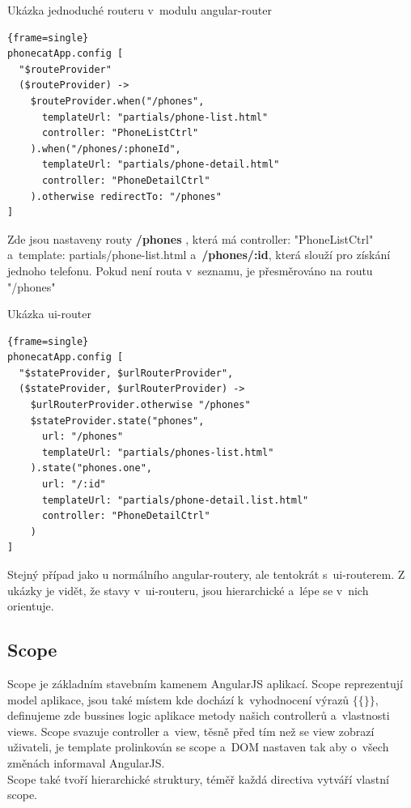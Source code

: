 \documentclass[a4paper,12pt,twoside,BCOR=10mm]{article}
\renewcommand{\b}[1]{\textbf{#1}} %
\newenvironment{codeframe}{%
  \begin{Sbox} 
    \begin{minipage} 
      {\columnwidth-\leftmargin-\rightmargin-2\fboxsep-2\fboxrule-4pt} 
}{%

  \end{minipage} 
  \end{Sbox} 
  \begin{center} 
    \fcolorbox{black}{codeback}{\TheSbox} 
  \end{center} 
}
\begin{document}
Ukázka jednoduché routeru v~modulu angular-router
     \begin{codeframe} 
      \begin{Verbatim}{frame=single}
phonecatApp.config [
  "$routeProvider"
  ($routeProvider) ->
    $routeProvider.when("/phones",
      templateUrl: "partials/phone-list.html"
      controller: "PhoneListCtrl"
    ).when("/phones/:phoneId",
      templateUrl: "partials/phone-detail.html"
      controller: "PhoneDetailCtrl"
    ).otherwise redirectTo: "/phones"
]
\end{Verbatim} 
    \end{codeframe}
Zde jsou nastaveny routy \b{/phones} , která má controller: "PhoneListCtrl" a~template: partials/phone-list.html a~\b{/phones/:id}, která slouží pro získání jednoho telefonu. Pokud není routa v~seznamu, je přesměrováno na routu "/phones"

Ukázka ui-router
     \begin{codeframe} 
      \begin{Verbatim}{frame=single}
phonecatApp.config [
  "$stateProvider, $urlRouterProvider",
  ($stateProvider, $urlRouterProvider) ->
    $urlRouterProvider.otherwise "/phones"
    $stateProvider.state("phones",
      url: "/phones"
      templateUrl: "partials/phones-list.html"
    ).state("phones.one",
      url: "/:id"
      templateUrl: "partials/phone-detail.list.html"
      controller: "PhoneDetailCtrl"
    )
]
\end{Verbatim} 
    \end{codeframe}
Stejný případ jako u normálního angular-routery, ale tentokrát s~ui-routerem. Z ukázky je vidět, že stavy v~ui-routeru, jsou hierarchické a~lépe se v~nich orientuje.\\

\subsection{Scope}
Scope je základním stavebním kamenem AngularJS aplikací. Scope reprezentují model aplikace, jsou také místem kde dochází k~vyhodnocení výrazů $\{\{ \}\}$, definujeme zde bussines logic aplikace metody našich controllerů a~vlastnosti views. Scope svazuje controller a~view, těsně před tím než se view zobrazí uživateli, je template prolinkován se scope a~DOM nastaven tak aby o~všech změnách informaval AngularJS.\cite{ngBOOK}\\

Scope také tvoří hierarchické struktury, téměř každá directiva vytváří vlastní scope.
\end{document}
